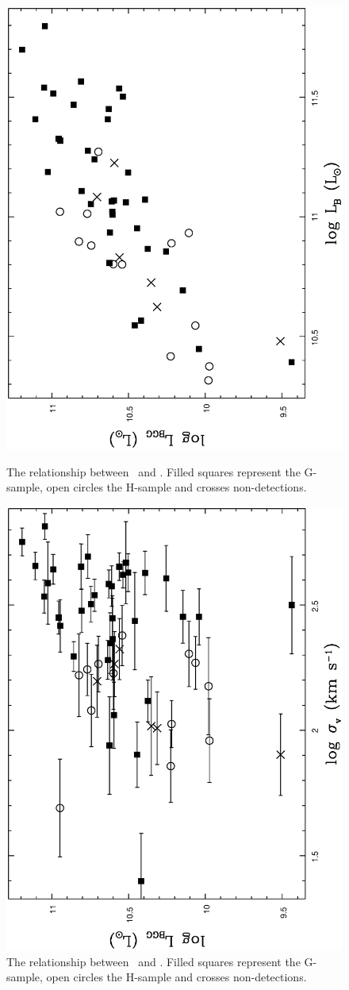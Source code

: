 \documentclass[usenatbib]{mn2e}
\begin{document}
\begin{figure}

  \includegraphics[height=\linewidth,angle=270]{fig_29.ps}
  \caption{The relationship between \LBGG\ and \LB.  Filled squares
           represent the G-sample, open circles the H-sample and crosses
           non-detections.}
  \label{fig_LBGG_LB}

  \includegraphics[height=\linewidth,angle=270]{fig_30.ps}
  \caption{The relationship between \LBGG\ and \sigmav.  Filled squares represent
           the G-sample, open circles the H-sample and crosses non-detections.}
  \label{fig_LBGG_sigma}

\end{figure}
\end{document}
